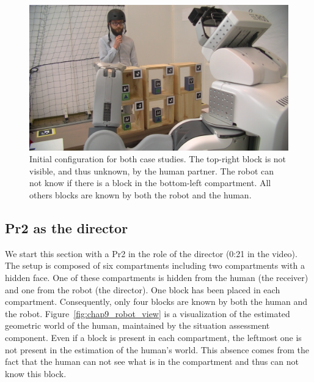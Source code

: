 \begin{figure}[ht!]
\centering
\includegraphics[width=\textwidth]{figures/chapter9/expe/config.png}
\caption{\label{fig:chap9_expe_config} Initial configuration for both case studies. The top-right block is not visible, and thus unknown, by the human partner. The robot can not know if there is a block in the bottom-left compartment. All others blocks are known by both the robot and the human.}
\end{figure}

\subsection{Pr2 as the director}

We start this section with a Pr2 in the role of the director (0:21 in the video). The setup is composed of six compartments including two compartments with a hidden face. One of these compartments is hidden from the human (the receiver) and one from the robot (the director). One block has been placed in each compartment. Consequently, only four blocks are known by both the human and the robot. Figure~\ref{fig:chap9_robot_view} is a visualization of the estimated geometric world of the human, maintained by the situation assessment component. Even if a block is present in each compartment, the leftmost one is not present in the estimation of the human's world. This absence comes from the fact that the human can not see what is in the compartment and thus can not know this block.

